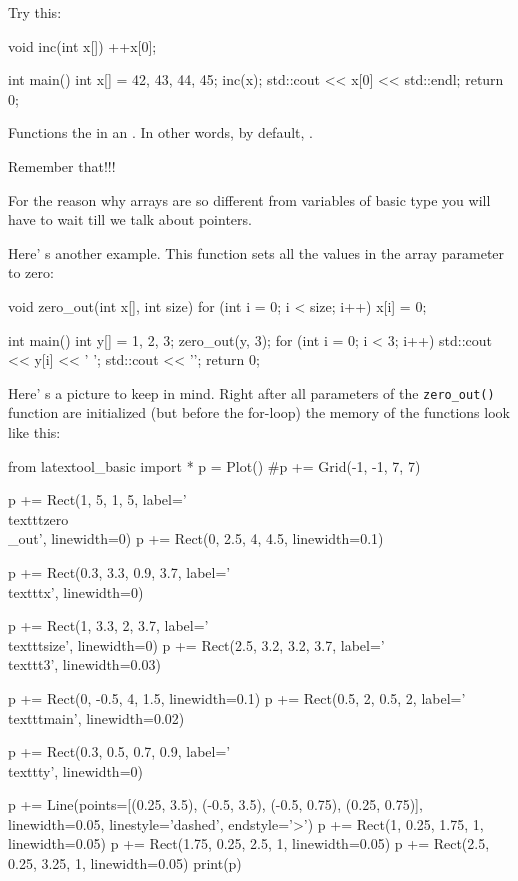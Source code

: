 Try this:

\begin{consolethree}[escapeinside=||]
void inc(int x[])
{
    ++x[0];
}

int main()
{
    int x[] = {42, 43, 44, 45};
    inc(x);
    std::cout << x[0] << std::endl;
    return 0;
}
\end{consolethree}

Functions  the  in an . In other words, by default, .

Remember that!!!

For the reason why arrays are so different from variables of basic type you will have to wait till we talk about pointers.

Here' s another example. This function sets all the values in the array parameter to zero:

\begin{consolethree}[escapeinside=||]
void zero_out(int x[], int size)
{
    for (int i = 0; i < size; i++)
    {
        x[i] = 0;
    }
}

int main()
{
    int y[] = {1, 2, 3};
    zero_out(y, 3);
    for (int i = 0; i < 3; i++)
    {
        std::cout << y[i] << ' ';
    }
    std::cout << '\n';
    return 0;
}
\end{consolethree}

Here' s a picture to keep in mind. Right after all parameters of the \texttt{zero\_out()} function are initialized (but before the for-loop) the memory of the functions look like this:

\begin{python}
from latextool_basic import *
p = Plot()
#p += Grid(-1, -1, 7, 7)

p += Rect(1, 5, 1, 5, label='\\texttt{zero\\_out}', linewidth=0)
p += Rect(0, 2.5, 4, 4.5, linewidth=0.1)

p += Rect(0.3, 3.3, 0.9, 3.7, label='\\texttt{x}', linewidth=0)

p += Rect(1, 3.3, 2, 3.7, label='\\texttt{size}', linewidth=0)
p += Rect(2.5, 3.2, 3.2, 3.7, label='\\texttt{3}', linewidth=0.03)

p += Rect(0, -0.5, 4, 1.5, linewidth=0.1)
p += Rect(0.5, 2, 0.5, 2, label='\\texttt{main}', linewidth=0.02)

p += Rect(0.3, 0.5, 0.7, 0.9, label='\\texttt{y}', linewidth=0)

p += Line(points=[(0.25, 3.5), (-0.5, 3.5), (-0.5, 0.75), (0.25, 0.75)], linewidth=0.05, linestyle='dashed', endstyle='>')
p += Rect(1, 0.25, 1.75, 1, linewidth=0.05)
p += Rect(1.75, 0.25, 2.5, 1, linewidth=0.05)
p += Rect(2.5, 0.25, 3.25, 1, linewidth=0.05)
print(p)
\end{python}


